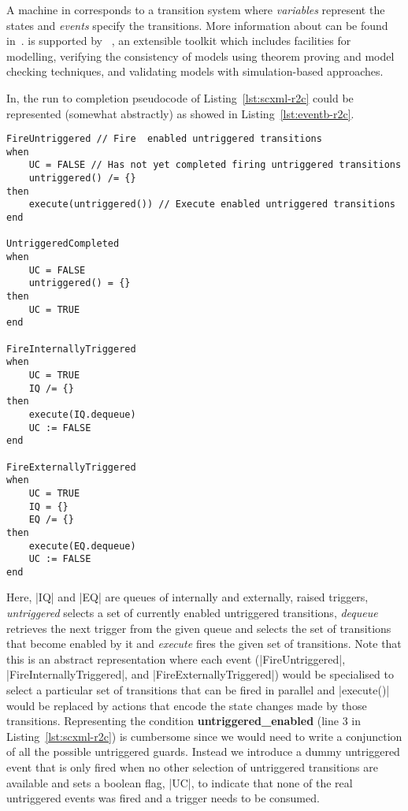 A machine in \EventB corresponds to a transition system
where \emph{variables} represent the states and \emph{events} specify
the transitions.    More information about \EventB can be found in~\cite{hoang13:_introd_event_b_model_method}.  \EventB is supported by
\Rodin~\cite{abrial10:_rodin}, an extensible toolkit which includes
facilities for modelling, verifying the consistency of models
using theorem proving and model checking techniques, and validating
models with simulation-based approaches.

In, \EventB the run to completion pseudocode of Listing~\ref{lst:scxml-r2c} could be represented (somewhat abstractly) as showed in Listing~\ref{lst:eventb-r2c}.
\begin{lstlisting}[caption={Run to completion pseudocode in \EventB},label={lst:eventb-r2c}, language=Event-B, escapechar=|, frame=single]
 FireUntriggered // Fire  enabled untriggered transitions
when
    UC = FALSE // Has not yet completed firing untriggered transitions
    untriggered() /= {}
then
    execute(untriggered()) // Execute enabled untriggered transitions
end

UntriggeredCompleted
when
    UC = FALSE
    untriggered() = {}
then
    UC = TRUE
end

FireInternallyTriggered
when
    UC = TRUE
    IQ /= {}
then
    execute(IQ.dequeue)
    UC := FALSE
end

FireExternallyTriggered
when
    UC = TRUE
    IQ = {}
    EQ /= {}
then
    execute(EQ.dequeue)
    UC := FALSE
end
\end{lstlisting}	
Here, |IQ| and |EQ| are queues of internally and externally, raised triggers, \emph{untriggered} selects a set of currently enabled untriggered transitions, \emph{dequeue} retrieves the next trigger from the given queue and selects the set of transitions that become enabled by it and \emph{execute} fires the given set of transitions. 
Note that this is an abstract representation where each event (|FireUntriggered|, |FireInternallyTriggered|, and |FireExternallyTriggered|) would be specialised to select a particular set of transitions that can be fired in parallel and |execute()| would be replaced by actions that encode the state changes made by those transitions.
Representing the condition \textbf{untriggered\_enabled} (line 3 in Listing~\ref{lst:scxml-r2c}) is cumbersome since we would need to write a conjunction of all the possible untriggered guards. Instead we introduce a dummy untriggered event that is only fired when no other selection of untriggered transitions are available and sets a boolean flag, |UC|, to indicate that none of the real untriggered events was fired and a trigger needs to be consumed.

